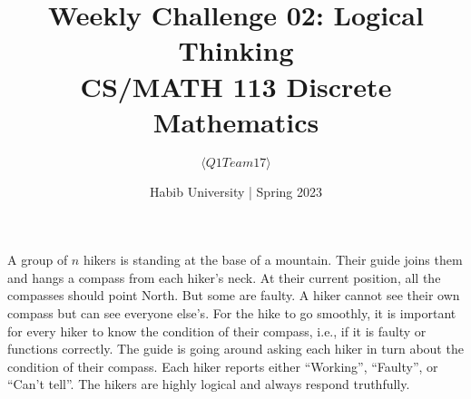 \documentclass[a4paper]{exam}
\title{Weekly Challenge 02: Logical Thinking\\CS/MATH 113 Discrete Mathematics}
\author{$\langle Q1 Team 17 \rangle$}  %
\date{Habib University | Spring 2023}
\begin{document}
\maketitle

\begin{questions}
  
  A group of $n$ hikers is standing at the base of a mountain. Their guide joins them and hangs a compass from each hiker's neck. At their current position, all the compasses should point North. But some are faulty. A hiker cannot see their own compass but can see everyone else's. For the hike to go smoothly, it is important for every hiker to know the condition of their compass, i.e., if it is faulty or functions correctly. The guide is going around asking each hiker in turn about the condition of their compass. Each hiker reports either ``Working'', ``Faulty'', or ``Can't tell''. The hikers are highly logical and always respond truthfully.



\end{questions}
\end{document}

